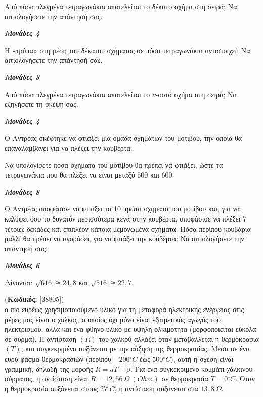 \documentclass[11pt,a4paper,twoside]{book}
\newcounter{askhsh}[chapter]
\renewcommand{\theaskhsh}{
	\bf{\titlefont{\Large{\thechapter}}.\arabic{askhsh}}
}
\newcommand{\Askhsh}[2]{\refstepcounter{askhsh}{\titlefont{Άσκηση\theaskhsh} - \textcolor{maincolor}{ΘΕΜΑ #2}} (\small{\textbf{Κωδικός:} #1})\\}{}
\newcommand{\monades}[1]{
\hspace*{\fill}
\textbf{\textit{\textcolor{maincolor}{Μονάδες #1}}}}
\begin{document}
\begin{alist}
\item

\begin{rlist}
\item Από πόσα πλεγμένα τετραγωνάκια αποτελείται το δέκατο σχήμα στη σειρά; Να αιτιολογήσετε την απάντησή σας.
\monades{4}
\item Η «τρύπα» στη μέση του δέκατου σχήματος σε πόσα τετραγωνάκια αντιστοιχεί; Να αιτιολογήσετε την απάντησή σας.
\monades{3}
\end{rlist}
\item Από πόσα πλεγμένα τετραγωνάκια αποτελείται το $\nu$-οστό σχήμα στη σειρά; Να εξηγήσετε τη σκέψη σας.
\monades{4}
\item Ο Αντρέας σκέφτηκε να φτιάξει μια ομάδα σχημάτων του μοτίβου, την οποία θα επαναλαμβάνει για να πλέξει την κουβέρτα.

\begin{rlist}
\item Να υπολογίσετε πόσα σχήματα του μοτίβου θα πρέπει να φτιάξει, ώστε τα τετραγωνάκια που θα πλέξει να είναι μεταξύ $500$ και $600$.
\monades{8}
\item Ο Αντρέας αποφάσισε να φτιάξει τα 10 πρώτα σχήματα του μοτίβου και, για να καλύψει όσο το δυνατόν περισσότερα κενά στην κουβέρτα, αποφάσισε να πλέξει $7$ τέτοιες δεκάδες και επιπλέον κάποια μεμονωμένα σχήματα. Πόσα περίπου κουβάρια μαλλί θα πρέπει να αγοράσει, για να φτιάξει την κουβέρτα; Να αιτιολογήσετε την απάντησή σας.
\monades{6}

Δίνονται: $\sqrt{616} \cong 24{,}8$ και $\sqrt{516} \cong 22{,}7$.
\end{rlist}
\end{alist}

\vspace{4mm}

\Askhsh{[38805]}
Το πιο ευρέως χρησιμοποιούμενο υλικό για τη μεταφορά ηλεκτρικής ενέργειας στις μέρες μας είναι ο χαλκός, ο οποίος όχι μόνο είναι εξαιρετικός αγωγός του ηλεκτρισμού, αλλά και ένα φθηνό υλικό με υψηλή ολκιμότητα (μορφοποιείται εύκολα σε σύρμα). Η αντίσταση $(R)$ του χαλκού αλλάζει όταν μεταβάλλεται η θερμοκρασία $(T)$, και συγκεκριμένα αυξάνεται με την αύξηση της θερμοκρασίας. Μέσα σε ένα ευρύ φάσμα θερμοκρασιών (περίπου $- 200{^\circ}C$ έως $500{^\circ}C$), αυτή η σχέση είναι γραμμική, δηλαδή της μορφής $R = a T + \beta$. Για ένα συγκεκριμένο κομμάτι χάλκινου σύρματος, η αντίσταση είναι $R = 12,56\ \Omega\ (Ohm)$ σε θερμοκρασία $T = 0{^\circ}C$. Όταν η θερμοκρασία αυξάνεται στους $27{^\circ}C$, η αντίσταση αυξάνεται στα $13,8\ \Omega$.
\end{document}
